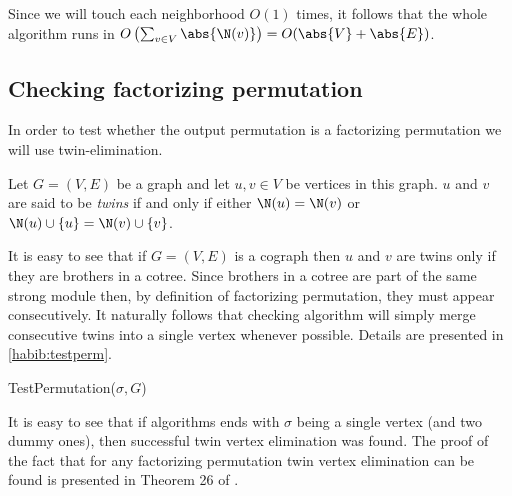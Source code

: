 Since we will touch each neighborhood $O(1)$ times, it follows that the whole algorithm runs in $O\left(\sum_{v\in V} \abs{\N(v)}\right) = O(\abs{V} + \abs{E})$.

\subsection{Checking factorizing permutation}

In order to test whether the output permutation is a factorizing permutation we will use twin-elimination.

\begin{defi}
    Let $G = (V,E)$ be a graph and let $u,v \in V$ be vertices in this graph. $u$ and $v$ are said to be \emph{twins} if and only if either $\N(u) = \N(v)$ or $\N(u)\cup\{u\} = \N(v)\cup\{v\}$.
\end{defi}

It is easy to see that if $G = (V,E)$ is a cograph then $u$ and $v$ are twins only if they are brothers in a cotree. Since brothers in a cotree are part of the same strong module then, by definition of factorizing permutation, they must appear consecutively. It naturally follows that checking algorithm will simply merge consecutive twins into a single vertex whenever possible. Details are presented in \ref{habib:testperm}.

\begin{function}
    \caption{TestPermutation($\sigma, G$)}
    \label{habib:testperm}
    \DontPrintSemicolon

\end{function}

It is easy to see that if algorithms ends with $\sigma$ being a single vertex (and two dummy ones), then successful twin vertex elimination was found. The proof of the fact that for any factorizing permutation twin vertex elimination can be found is presented in Theorem 26 of \cite{habib}.

